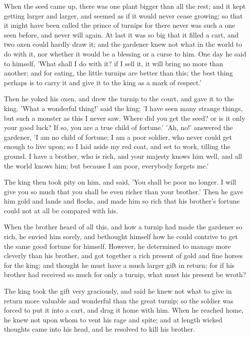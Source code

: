 \documentclass[12pt]{book}
\begin{document}
When the seed came up, there was one plant bigger than all the rest;
and it kept getting larger and larger, and seemed as if it would never
cease growing; so that it might have been called the prince of turnips
for there never was such a one seen before, and never will again. At
last it was so big that it filled a cart, and two oxen could hardly
draw it; and the gardener knew not what in the world to do with it,
nor whether it would be a blessing or a curse to him. One day he said
to himself, 'What shall I do with it? if I sell it, it will bring no
more than another; and for eating, the little turnips are better than
this; the best thing perhaps is to carry it and give it to the king as
a mark of respect.'

Then he yoked his oxen, and drew the turnip to the court, and gave it
to the king. 'What a wonderful thing!' said the king; 'I have seen
many strange things, but such a monster as this I never saw. Where did
you get the seed? or is it only your good luck? If so, you are a true
child of fortune.' 'Ah, no!' answered the gardener, 'I am no child of
fortune; I am a poor soldier, who never could get enough to live upon;
so I laid aside my red coat, and set to work, tilling the ground. I
have a brother, who is rich, and your majesty knows him well, and all
the world knows him; but because I am poor, everybody forgets me.'

The king then took pity on him, and said, 'You shall be poor no
longer. I will give you so much that you shall be even richer than
your brother.' Then he gave him gold and lands and flocks, and made
him so rich that his brother's fortune could not at all be compared
with his.

When the brother heard of all this, and how a turnip had made the
gardener so rich, he envied him sorely, and bethought himself how he
could contrive to get the same good fortune for himself. However, he
determined to manage more cleverly than his brother, and got together
a rich present of gold and fine horses for the king; and thought he
must have a much larger gift in return; for if his brother had
received so much for only a turnip, what must his present be wroth?

The king took the gift very graciously, and said he knew not what to
give in return more valuable and wonderful than the great turnip; so
the soldier was forced to put it into a cart, and drag it home with
him. When he reached home, he knew not upon whom to vent his rage and
spite; and at length wicked thoughts came into his head, and he
resolved to kill his brother.
\end{document}
